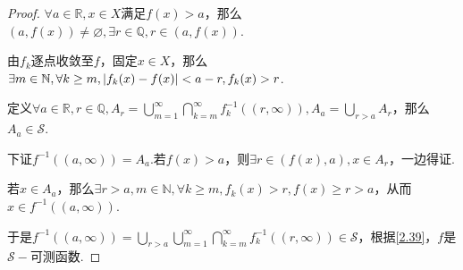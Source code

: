 \begin{comment}
    \begin{proof}
        考虑任意的\(a \in \mathbb{R}, n \in \mathbb{N}, m \in \mathbb{N}\)，下面将证明
        \begin{align*}
            f^{-1}((a,\infty))=\bigcup_{n=1}^\infty \bigcup_{m=1}^\infty \bigcap_{k=m}^\infty f_k^{-1}\left(\left(a+\frac{1}{n},\infty\right)\right)
        \end{align*}
        设\(x \in f^{-1}((a,\infty)), f(x)>a\)，开集的所有点都是内点，因此\(\exists n \in \mathbb{N}, f(x)>a+\frac{1}{n}\).

        由于\(\lim_{k \to \infty}f_k(x)=f(x)\)，因而\(\exists m \in \mathbb{N}, \forall k \geq m, f_k(x)>a+\frac{1}{n}\).

        因此\(\forall k \geq m, x \in f_k^{-1}((a+\frac{1}{n}))\)，
        则\(f^{-1}((a,\infty)) \subseteq \bigcup_{n=1}^\infty \bigcup_{m=1}^\infty \bigcap_{k=m}^\infty f_k^{-1}((a+\frac{1}{n},\infty))\).

        设\(x \in \bigcup_{n=1}^\infty \bigcup_{m=1}^\infty \bigcap_{k=m}^\infty f_k^{-1}((a+\frac{1}{n},\infty))\)，
        即\(\exists m,n \in \mathbb{N}, \forall k \geq m, f_k(x)>a+\frac{1}{n}\).

        取\(k \to \infty\)，得到\(f(x)=\lim_{k \to \infty}f_k(x) \geq a+\frac{1}{n}>a, x \in f^{-1}((a,\infty))\).

        由于\(\forall n,k \in \mathbb{N}, f_k^{-1}((a+\frac{1}{n},\infty)) \in \mathcal{S}\)，故\(f^{-1}((a,\infty)) \in \mathcal{S}\)，证毕.
    \end{proof}
\end{comment}

\begin{proof}
    \(\forall a \in \mathbb{R}, x \in X\)满足\(f(x)>a\)，那么\((a,f(x)) \ne \varnothing, \exists r \in \mathbb{Q}, r \in (a,f(x))\).

    由\(f_k\)逐点收敛至\(f\)，固定\(x \in X\)，那么\(\exists m \in \mathbb{N}, \forall k \geq m, \abs*{f_k(x)-f(x)}<a-r, f_k(x)>r\).

    定义\(\forall a \in \mathbb{R}, r \in \mathbb{Q}, A_r=\bigcup_{m=1}^\infty \bigcap_{k=m}^\infty f_k^{-1}((r,\infty)), A_a=\bigcup_{r>a}A_r\)，那么\(A_a \in \mathcal{S}\).

    下证\(f^{-1}((a,\infty))=A_a\).若\(f(x)>a\)，则\( \exists r \in (f(x),a), x \in A_r\)，一边得证.

    若\(x \in A_a\)，那么\(\exists r>a, m \in \mathbb{N}, \forall k \geq m, f_k(x)>r, f(x) \geq r>a\)，从而\(x \in f^{-1}((a,\infty))\).

    于是\(f^{-1}((a,\infty))=\bigcup_{r>a} \bigcup_{m=1}^\infty \bigcap_{k=m}^\infty f_k^{-1}((r,\infty)) \in \mathcal{S}\)，根据\cref{2.39}，\(f\)是\(\mathcal{S}-\)可测函数.
\end{proof}

